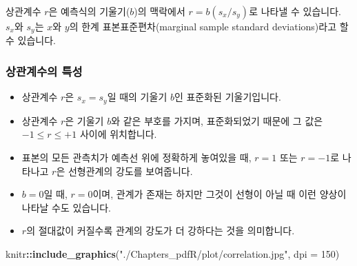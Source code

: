 \documentclass[]{book}
\newenvironment{Shaded}{\begin{snugshade}}{\end{snugshade}}
\newcommand{\DataTypeTok}[1]{\textcolor[rgb]{0.13,0.29,0.53}{#1}}
\newcommand{\DecValTok}[1]{\textcolor[rgb]{0.00,0.00,0.81}{#1}}
\newcommand{\KeywordTok}[1]{\textcolor[rgb]{0.13,0.29,0.53}{\textbf{#1}}}
\newcommand{\NormalTok}[1]{#1}
\newcommand{\OperatorTok}[1]{\textcolor[rgb]{0.81,0.36,0.00}{\textbf{#1}}}
\newcommand{\StringTok}[1]{\textcolor[rgb]{0.31,0.60,0.02}{#1}}
\providecommand{\tightlist}{%
  \setlength{\itemsep}{0pt}\setlength{\parskip}{0pt}}
\begin{document}
상관계수 \(r\)은 예측식의 기울기(\(b\))의 맥락에서 \(r = b(s_x/s_y)\)로 나타낼 수 있습니다. \(s_x\)와 \(s_y\)는 \(x\)와 \(y\)의 한계 표본표준편차(marginal sample standard deviations)라고 할 수 있습니다.

\hypertarget{uxc0c1uxad00uxacc4uxc218uxc758-uxd2b9uxc131}{%
\subsubsection{상관계수의 특성}\label{uxc0c1uxad00uxacc4uxc218uxc758-uxd2b9uxc131}}

\begin{itemize}
\tightlist
\item
  상관계수 \(r\)은 \(s_x = s_y\)일 때의 기울기 \(b\)인 표준화된 기울기입니다.
\item
  상관계수 \(r\)은 기울기 \(b\)와 같은 부호를 가지며, 표준화되었기 때문에 그 값은 \(-1 \leq r \leq +1\) 사이에 위치합니다.
\item
  표본의 모든 관측치가 예측선 위에 정확하게 놓여있을 때, \(r = 1\) 또는 \(r = -1\)로 나타나고 \(r\)은 선형관계의 강도를 보여줍니다.
\item
  \(b = 0\)일 때, \(r = 0\)이며, 관계가 존재는 하지만 그것이 선형이 아닐 때 이런 양상이 나타날 수도 있습니다.
\item
  \(r\)의 절대값이 커질수록 관계의 강도가 더 강하다는 것을 의미합니다.
\end{itemize}

\begin{Shaded}
\begin{Highlighting}[]
\NormalTok{knitr}\OperatorTok{::}\KeywordTok{include_graphics}\NormalTok{(}\StringTok{"./Chapters_pdfR/plot/correlation.jpg"}\NormalTok{, }\DataTypeTok{dpi =} \DecValTok{150}\NormalTok{)}
\end{Highlighting}
\end{Shaded}
\end{document}
